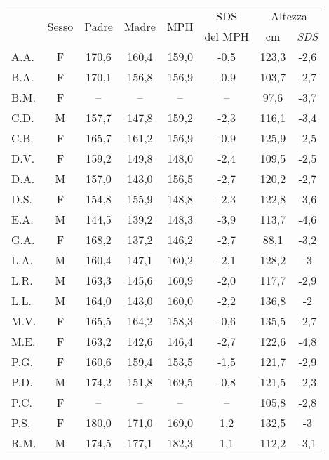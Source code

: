 \begin{table}[!h]
\begin{center}
\begin{tabular}{lccccccc}
\toprule
 & \multirow{2}{*}{Sesso} & 
   \multirow{2}{*}{Padre} & 
   \multirow{2}{*}{Madre} & 
   \multirow{2}{*}{MPH} & 
   SDS  & 
   
   \multicolumn{2}{c}{Altezza} \\
 \cmidrule(r){7-8}
 & &   	& & & del MPH &		cm				& \emph{SDS}             	 \\
\midrule
A.A.	& F & 170,6 & 160,4 & 159,0 & -0,5 	 		& 123,3 & -2,6  \\
B.A.	& F & 170,1 & 156,8 & 156,9 & -0,9   			& 103,7 & -2,7   \\
B.M.	& F & --    & --    & --    & --     			&  97,6 & -3,7  \\
C.D.	& M & 157,7 & 147,8 & 159,2 & -2,3 	        	& 116,1 & -3,4  \\
C.B.	& F & 165,7 & 161,2 & 156,9 & -0,9 	 	        & 125,9 & -2,5  \\
D.V.	& F & 159,2 & 149,8 & 148,0 & -2,4   			& 109,5 & -2,5   \\
D.A.	& M & 157,0 & 143,0 & 156,5 & -2,7 	  		& 120,2 & -2,7  \\
D.S.	& F & 154,8 & 155,9 & 148,8 & -2,3   			& 122,8 & -3,6  \\
E.A.	& M & 144,5 & 139,2 & 148,3 & -3,9 	  		& 113,7 & -4,6  \\
G.A.	& F & 168,2 & 137,2 & 146,2 & -2,7 	  		&  88,1 & -3,2  \\
L.A.	& M & 160,4 & 147,1 & 160,2 & -2,1   			& 128,2 & -3    \\
L.R.	& M & 163,3 & 145,6 & 160,9 & -2,0 	  		& 117,7 & -2,9  \\
L.L.	& M & 164,0 & 143,0 & 160,0 & -2,2 	  		& 136,8 & -2     \\
M.V.	& F & 165,5 & 164,2 & 158,3 & -0,6   			& 135,5 & -2,7  \\
M.E.	& F & 163,2 & 142,6 & 146,4 & -2,7 	  		& 122,6 & -4,8  \\
P.G.	& F & 160,6 & 159,4 & 153,5 & -1,5   			& 121,7 & -2,9  \\
P.D.	& M & 174,2 & 151,8 & 169,5 & -0,8 	  		& 121,5 & -2,3  \\
P.C.	& F & --    & --    & --    & --   	  		& 105,8 & -2,8   \\
P.S.	& F & 180,0 & 171,0 & 169,0 & 1,2  	  		& 132,5 & -3    \\
R.M.	& M & 174,5 & 177,1 & 182,3 & 1,1    			& 112,2 & -3,1  \\

\end{tabular}
\end{center}
\end{table}
